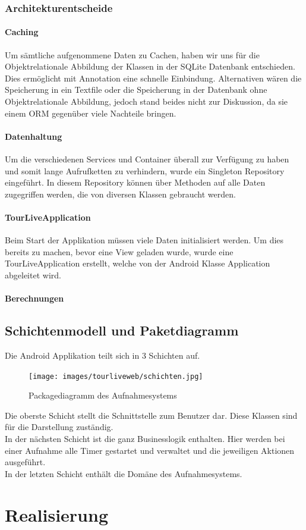 \subsubsection{Architekturentscheide}

\paragraph{Caching}
Um sämtliche aufgenommene Daten zu Cachen, haben wir uns für die Objektrelationale Abbildung der Klassen in der SQLite Datenbank entschieden. Dies ermöglicht mit Annotation eine schnelle Einbindung. Alternativen wären die Speicherung in ein Textfile oder die Speicherung in der Datenbank ohne Objektrelationale Abbildung, jedoch stand beides nicht zur Diskussion, da sie einem ORM gegenüber viele Nachteile bringen.

\paragraph{Datenhaltung}
Um die verschiedenen Services und Container überall zur Verfügung zu haben und somit lange Aufrufketten zu verhindern, wurde ein Singleton Repository eingeführt. In diesem Repository können über Methoden auf alle Daten zugegriffen werden, die von diversen Klassen gebraucht werden.

\paragraph{TourLiveApplication}
Beim Start der Applikation müssen viele Daten initialisiert werden. Um dies bereits zu machen, bevor eine View geladen wurde, wurde eine TourLiveApplication erstellt, welche von der Android Klasse Application abgeleitet wird. 

\paragraph{Berechnungen}

\subsection{Schichtenmodell und Paketdiagramm}
Die Android Applikation teilt sich in 3 Schichten auf.

\begin{figure}[H]
	\centering
	\texttt{[image: images/tourliveweb/schichten.jpg]}
	\caption{Packagediagramm des Aufnahmesystems}
\end{figure}

Die oberste Schicht stellt die Schnittstelle zum Benutzer dar. Diese Klassen sind für die Darstellung zuständig.\\
In der nächsten Schicht ist die ganz Businesslogik enthalten. Hier werden bei einer Aufnahme alle Timer gestartet und verwaltet und die jeweiligen Aktionen ausgeführt. \\
In der letzten Schicht enthält die Domäne des Aufnahmesystems.

\section{Realisierung}